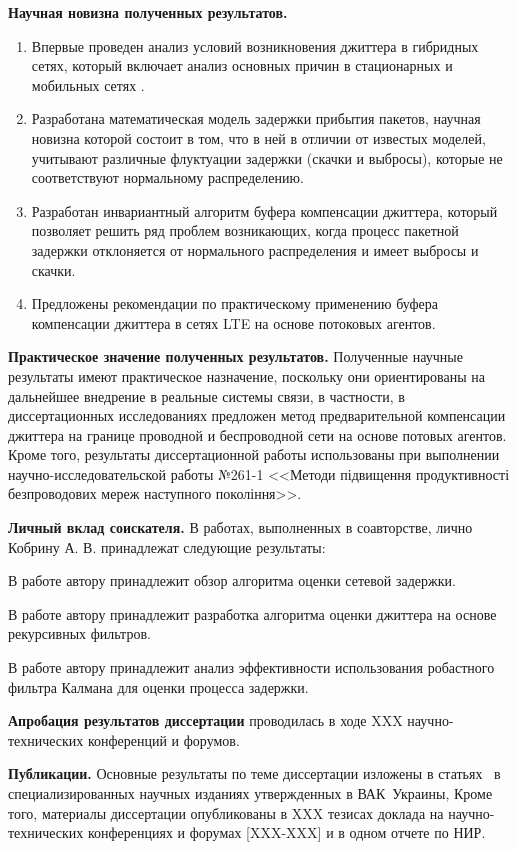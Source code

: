 \textbf{Научная новизна полученных результатов.} 
\begin{enumerate}
  \item Впервые проведен анализ условий возникновения джиттера в гибридных сетях, который включает анализ основных причин в стационарных и мобильных сетях .
  \item Разработана математическая модель задержки прибытия пакетов, научная новизна которой состоит в том, что в ней в отличии от известых моделей, учитывают различные флуктуации задержки (скачки и выбросы), которые не соответствуют нормальному распределению.
  \item Разработан инвариантный алгоритм буфера компенсации джиттера, который позволяет решить ряд проблем возникающих, когда процесс пакетной задержки отклоняется от нормального распределения и имеет выбросы и скачки.
  \item Предложены рекомендации по практическому применению буфера компенсации джиттера в сетях LTE на основе потоковых агентов.
\end{enumerate}

\textbf{Практическое значение полученных результатов.} Полученные научные результаты имеют практическое назначение, поскольку они ориентированы на дальнейшее внедрение в реальные системы связи, в частности, в диссертационных исследованиях предложен метод предварительной компенсации джиттера на границе проводной и беспроводной сети на основе потовых агентов.
Кроме того, результаты диссертационной работы использованы при выполнении научно-исследовательской работы №261-1 <<Методи підвищення продуктивності безпроводових мереж наступного покоління>>.


\textbf{Личный вклад соискателя.} В работах, выполненных в соавторстве, лично Кобрину А. В. принадлежат следующие результаты: 

В работе \cite{my1} автору принадлежит обзор алгоритма оценки сетевой задержки.

В работе \cite{my2} автору принадлежит разработка алгоритма оценки джиттера на основе рекурсивных фильтров.

В работе \cite{my4} автору принадлежит анализ эффективности использования робастного фильтра Калмана для оценки процесса задержки.

\textbf{Апробация результатов диссертации} проводилась в ходе XXX научно-технических конференций и форумов. 


\textbf{Публикации.} Основные результаты по теме диссертации изложены в статьях~\cite{my1,my2,my3,my4,my5} в специализированных научных изданиях утвержденных в ВАК~Украины, Кроме того, материалы диссертации опубликованы в XXX тезисах доклада на научно-технических конференциях и форумах [XXX-XXX] и в одном отчете по НИР.


\clearpage
